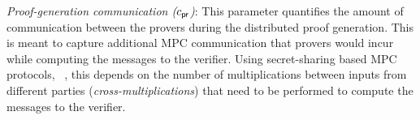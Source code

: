 \noindent\textit{Proof-generation communication ($c_\mathsf{pr}$)}:
This parameter quantifies the amount of communication between the provers during the distributed proof generation. This is meant to capture additional MPC communication that provers would incur while computing the messages to the verifier. Using secret-sharing based MPC protocols, ~\cite{GMW87, BGW88, SPDZ}, this depends on the number of multiplications between inputs from different parties ({\em cross-multiplications}) that need to be performed to compute the messages to the verifier. 


